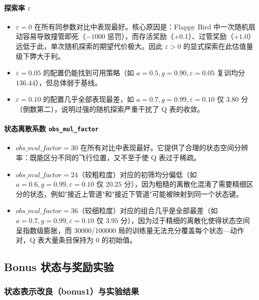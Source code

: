 \documentclass[12pt]{article}
\begin{document}
\paragraph{探索率 $\varepsilon$}

\begin{itemize}
	\item $\varepsilon = 0$ 在所有同参数对比中表现最好。核心原因是：Flappy Bird 中一次随机扇动容易导致撞管即死（$-1000$ 惩罚），而存活奖励（$+0.1$）、过管奖励（$+1.0$）远低于此，单次随机探索的期望代价极大。因此 $\varepsilon > 0$ 的显式探索在此估值量级下弊大于利。
	\item $\varepsilon = 0.05$ 的配置仍能找到可用策略（如 $a=0.5, g=0.90, \varepsilon=0.05$ 复训均分 $136.44$），但总体弱于基线。
	\item $\varepsilon = 0.10$ 的配置几乎全部表现最差，如 $a=0.7, g=0.99, \varepsilon=0.10$ 仅 $3.80$ 分（倒数第二），说明过强的随机探索严重干扰了 Q 表的收敛。
\end{itemize}

\paragraph{状态离散系数 \texttt{obs\_mul\_factor}}

\begin{itemize}
	\item $obs\_mul\_factor = 30$ 在所有对比中表现最好。它提供了合理的状态空间分辨率：既能区分不同的飞行位置，又不至于使 Q 表过于稀疏。
	\item $obs\_mul\_factor = 24$（较粗粒度）对应的初筛均分偏低（如 $a=0.6, g=0.99, \varepsilon=0.10$ 仅 $20.25$ 分），因为粗糙的离散化混淆了需要精细区分的状态，例如"接近上管道"和"接近下管道"可能被映射到同一个状态键。
	\item $obs\_mul\_factor = 36$（较细粒度）对应的组合几乎是全部最差（如 $a=0.7, g=0.99, \varepsilon=0.10$ 仅 $3.95$ 分），因为过于精细的离散化使得状态空间呈指数级膨胀，而 30000/100000 局的训练量无法充分覆盖每个状态—动作对，Q 表大量条目保持为 $0$ 的初始值。
\end{itemize}

\subsection{Bonus 状态与奖励实验}

\subsubsection{状态表示改良（bonus1）与实验结果}
\end{document}
